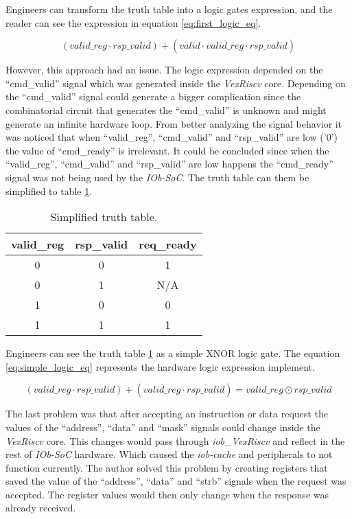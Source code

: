 Engineers can transform the truth table into a logic gates expression, and the reader can see the expression in equation \ref{eq:first_logic_eq}.

\begin{equation}
  (valid\_reg \cdot rsp\_valid) + (valid \cdot \overline{valid\_reg} \cdot \overline{rsp\_valid})
  \label{eq:first_logic_eq}
\end{equation}

However, this approach had an issue. The logic expression depended on the \enquote{cmd\_valid} signal which was generated inside the \textit{VexRiscv} core. Depending on the \enquote{cmd\_valid} signal could generate a bigger complication since the combinatorial circuit that generates the \enquote{cmd\_valid} is unknown and might generate an infinite hardware loop. From better analyzing the signal behavior it was noticed that when \enquote{valid\_reg}, \enquote{cmd\_valid} and \enquote{rsp\_valid} are low ('0') the value of \enquote{cmd\_ready} is irrelevant. It could be concluded since when the \enquote{valid\_reg}, \enquote{cmd\_valid} and \enquote{rsp\_valid} are low happens the \enquote{cmd\_ready} signal was not being used by the \textit{IOb-SoC}. The truth table can them be simplified to table \ref{tab:simple_truth_table}.

\begin{table}[!ht]
  \centering
  \begin{tabular}{cc|c}
  valid\_reg & rsp\_valid & req\_ready \\ \hline
  0          & 0          & 1          \\
  0          & 1          & N/A        \\
  1          & 0          & 0          \\
  1          & 1          & 1         
  \end{tabular}
  \caption{Simplified truth table.}
  \label{tab:simple_truth_table}
\end{table}

Engineers can see the truth table \ref{tab:simple_truth_table} as a simple XNOR logic gate. The equation \ref{eq:simple_logic_eq} represents the hardware logic expression implement.

\begin{equation}
  (valid\_reg \cdot rsp\_valid) + (\overline{valid\_reg} \cdot \overline{rsp\_valid}) = valid\_reg \odot rsp\_valid
  \label{eq:simple_logic_eq}
\end{equation}

The last problem was that after accepting an instruction or data request the values of the \enquote{address}, \enquote{data} and \enquote{mask} signals could change inside the \textit{VexRiscv} core. This changes would pass through \textit{iob\_VexRiscv} and reflect in the rest of \textit{IOb-SoC} hardware. Which caused the \textit{iob-cache} and peripherals to not function currently. The author solved this problem by creating registers that saved the value of the \enquote{address}, \enquote{data} and \enquote{strb} signals when the request was accepted. The register values would then only change when the response was already received.

